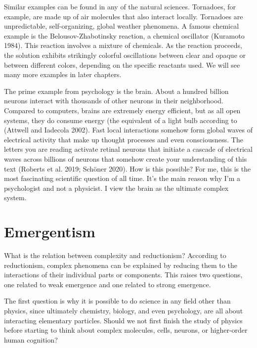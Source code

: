\documentclass[
  a4paper,
  DIV=11,
  numbers=noendperiod,
  oneside]{scrreprt}
\begin{document}
Similar examples can be found in any of the natural sciences. Tornadoes,
for example, are made up of air molecules that also interact locally.
Tornadoes are unpredictable, self-organizing, global weather phenomena.
A famous chemical example is the Belousov-Zhabotinsky reaction, a
chemical oscillator (Kuramoto 1984). This reaction involves a mixture of
chemicals. As the reaction proceeds, the solution exhibits strikingly
colorful oscillations between clear and opaque or between different
colors, depending on the specific reactants used. We will see many more
examples in later chapters.

The prime example from psychology is the brain. About a hundred billion
neurons interact with thousands of other neurons in their neighborhood.
Compared to computers, brains are extremely energy efficient, but as all
open systems, they do consume energy (the equivalent of a light bulb
according to (Attwell and Iadecola 2002). Fast local interactions
somehow form global waves of electrical activity that make up thought
processes and even consciousness. The letters you are reading activate
retinal neurons that initiate a cascade of electrical waves across
billions of neurons that somehow create your understanding of this text
(Roberts et al. 2019; Schöner 2020). How is this possible? For me, this
is the most fascinating scientific question of all time. It's the main
reason why I'm a psychologist and not a physicist. I view the brain as
the ultimate complex system.

\hypertarget{sec-Emergentism}{%
\section{Emergentism}\label{sec-Emergentism}}

What is the relation between complexity and reductionism? According to
reductionism, complex phenomena can be explained by reducing them to the
interactions of their individual parts or components. This raises two
questions, one related to weak emergence and one related to strong
emergence.

The first question is why it is possible to do science in any field
other than physics, since ultimately chemistry, biology, and even
psychology, are all about interacting elementary particles. Should we
not first finish the study of physics before starting to think about
complex molecules, cells, neurons, or higher-order human cognition?
\end{document}
